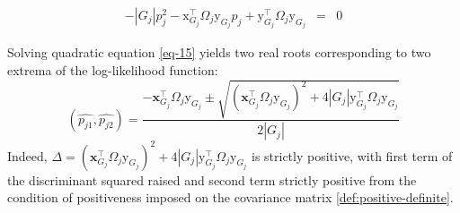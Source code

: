 \documentclass[pdflatex, sn-nature]{sn-jnl}
\theoremstyle{thmstyleone}%
\theoremstyle{thmstyletwo}%
\theoremstyle{thmstylethree}%
\begin{document}
\begin{appendices}
\begin{equation}
\begin{array}{ccl}
                - |G_j| p_j^2 - \mathrm{x}_{G_j}^\top \Omega_j \mathrm{y}_{G_j} p_j + \mathrm{y}_{ G_j}^\top \Omega_{j} \mathrm{y}_{ G_j}                                                                                                                                                                                                                   & =                   & 0
            \end{array}
        \end{equation}

        Solving quadratic equation \ref{eq-15} yields two real roots corresponding
        to two extrema of the log-likelihood function:
        \begin{equation}
            \label{eq-16}(\hat{p_{j1}}, \hat{p_{j2}}) = \frac{- \boldsymbol{x}_{G_j}^{\top}
            \Omega_{j} \mathrm{y}_{ G_j}\pm
            \sqrt{\left( \boldsymbol{x}_{G_j}^\top \Omega_j \mathrm{y}_{ G_j}\right)^2
            +4 |G_j| \mathrm{y}_{ G_j}^\top \Omega_{j} \mathrm{y}_{ G_j} }}{2 |G_{j}|}
        \end{equation}
        Indeed, $\Delta=\left( \boldsymbol{x}_{G_j}^{\top} \Omega_{j} \mathrm{y}_{
        G_j}\right)^{2} +4 |G_{j}| \mathrm{y}_{ G_j}^{\top} \Omega_{j}\mathrm{y}_{
        G_j}$ is strictly positive, with first term of the discriminant squared
        raised and second term strictly positive from the condition of
        positiveness imposed on the covariance matrix
        \ref{def:positive-definite}.


\end{appendices}
\end{document}
